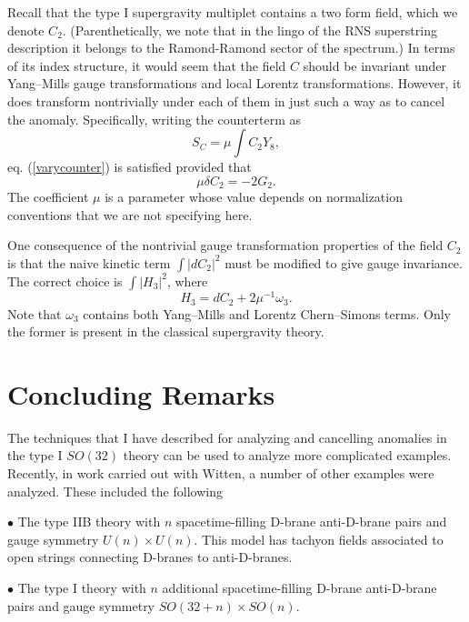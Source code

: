 \documentclass[a4paper,12pt]{article}
\begin{document}
Recall that the type I supergravity multiplet contains a two form
field, which we denote $C_2$. (Parenthetically, we note that in
the lingo of the RNS superstring description it belongs to the
Ramond-Ramond sector of the spectrum.) In terms of its index
structure, it would seem that the field $C$ should be invariant
under Yang--Mills gauge transformations and local Lorentz
transformations. However, it does transform nontrivially under
each of them in just such a way as to cancel the
anomaly.\cite{Green:1984sg} Specifically, writing the counterterm
as
\begin{equation}
 S_{C} = \mu \int C_2 Y_8,
\end{equation}
eq. (\ref{varycounter}) is satisfied provided that
\begin{equation}
\mu \delta C_2 = -2 G_2.
\end{equation}
The coefficient $\mu$ is a parameter whose value depends on
normalization conventions that we are not specifying here.

One consequence of the nontrivial gauge transformation properties
of the field $C_2$ is that the naive kinetic term $ \int |dC_2|^2$
must be modified to give gauge invariance. The correct choice is
$\int |H_3 |^2$, where
\begin{equation}
H_3 = dC_2 + 2 \mu^{-1} \omega_3.
\end{equation}
Note that $\omega_3$ contains both  Yang--Mills and Lorentz
Chern--Simons terms. Only the former is present in the classical
supergravity theory.

\section{Concluding Remarks}
The techniques that I have described for analyzing and cancelling
anomalies in the type I $SO(32)$ theory can be used to
analyze more complicated examples. Recently, in work carried out
with Witten,\cite{Schwarz:2001sf} a number of other examples were
analyzed. These included the following

\noindent $\bullet$ The type IIB theory with $n$ spacetime-filling
D-brane anti-D-brane pairs and gauge symmetry $U(n) \times
U(n)$.\cite{Srednicki:1998mq} This model has tachyon fields
associated to open strings connecting D-branes to anti-D-branes.

\noindent $\bullet$ The type I theory with $n$ additional
spacetime-filling D-brane anti-D-brane pairs and gauge symmetry
$SO(32+n) \times SO(n)$.\cite{Sugimoto:1999tx}
\end{document}
